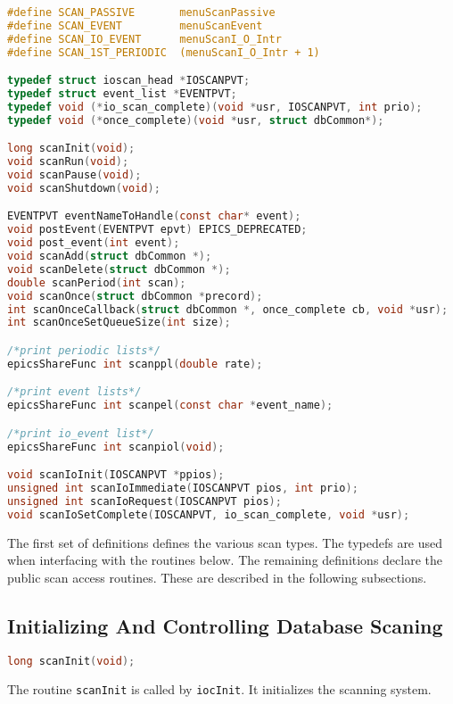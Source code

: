 \begin{lstlisting}[language=C]
#define SCAN_PASSIVE       menuScanPassive
#define SCAN_EVENT         menuScanEvent
#define SCAN_IO_EVENT      menuScanI_O_Intr
#define SCAN_1ST_PERIODIC  (menuScanI_O_Intr + 1)

typedef struct ioscan_head *IOSCANPVT;
typedef struct event_list *EVENTPVT;
typedef void (*io_scan_complete)(void *usr, IOSCANPVT, int prio);
typedef void (*once_complete)(void *usr, struct dbCommon*);

long scanInit(void);
void scanRun(void);
void scanPause(void);
void scanShutdown(void);

EVENTPVT eventNameToHandle(const char* event);
void postEvent(EVENTPVT epvt) EPICS_DEPRECATED;
void post_event(int event);
void scanAdd(struct dbCommon *);
void scanDelete(struct dbCommon *);
double scanPeriod(int scan);
void scanOnce(struct dbCommon *precord);
int scanOnceCallback(struct dbCommon *, once_complete cb, void *usr);
int scanOnceSetQueueSize(int size);

/*print periodic lists*/
epicsShareFunc int scanppl(double rate);

/*print event lists*/
epicsShareFunc int scanpel(const char *event_name);

/*print io_event list*/
epicsShareFunc int scanpiol(void);

void scanIoInit(IOSCANPVT *ppios);
unsigned int scanIoImmediate(IOSCANPVT pios, int prio);
unsigned int scanIoRequest(IOSCANPVT pios);
void scanIoSetComplete(IOSCANPVT, io_scan_complete, void *usr);
\end{lstlisting}

The first set of definitions defines the various scan types.
The typedefs are used when interfacing with the routines below.
The remaining definitions declare the public scan access routines.
These are described in the following subsections.

\subsection{Initializing And Controlling Database Scaning}

\begin{lstlisting}[language=C]
long scanInit(void);
\end{lstlisting}

The routine \verb|scanInit| is called by \verb|iocInit|.
It initializes the scanning system.

